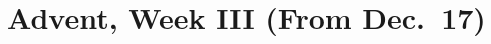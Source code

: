 \documentclass{lbi_organ_bind}
\begin{document}


\chapter{Advent, Week III (From Dec.\ 17)}

\end{document}
